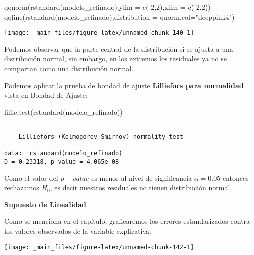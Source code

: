 \documentclass[
  a4paper,
  oneside,
  openany]{book}
\newenvironment{Shaded}{\begin{snugshade}}{\end{snugshade}}
\newcommand{\AttributeTok}[1]{\textcolor[rgb]{0.77,0.63,0.00}{#1}}
\newcommand{\DecValTok}[1]{\textcolor[rgb]{0.00,0.00,0.81}{#1}}
\newcommand{\FunctionTok}[1]{\textcolor[rgb]{0.00,0.00,0.00}{#1}}
\newcommand{\NormalTok}[1]{#1}
\newcommand{\SpecialCharTok}[1]{\textcolor[rgb]{0.00,0.00,0.00}{#1}}
\newcommand{\StringTok}[1]{\textcolor[rgb]{0.31,0.60,0.02}{#1}}
\begin{document}
\begin{Shaded}
\begin{Highlighting}[]
\FunctionTok{qqnorm}\NormalTok{(}\FunctionTok{rstandard}\NormalTok{(modelo\_refinado),}\AttributeTok{ylim =} \FunctionTok{c}\NormalTok{(}\SpecialCharTok{{-}}\DecValTok{2}\NormalTok{,}\DecValTok{2}\NormalTok{),}\AttributeTok{xlim =} \FunctionTok{c}\NormalTok{(}\SpecialCharTok{{-}}\DecValTok{2}\NormalTok{,}\DecValTok{2}\NormalTok{))}
\FunctionTok{qqline}\NormalTok{(}\FunctionTok{rstandard}\NormalTok{(modelo\_refinado),}\AttributeTok{distribution =}\NormalTok{ qnorm,}\AttributeTok{col=}\StringTok{"deeppink4"}\NormalTok{)}
\end{Highlighting}
\end{Shaded}

\begin{center}\texttt{[image: \_main\_files/figure-latex/unnamed-chunk-140-1]} \end{center}

Podemos observar que la parte central de la distribución si se ajusta a una distribución normal, sin embargo, en los extremos los residuales ya no se comportan como una distribución normal.

Podemos aplicar la prueba de bondad de ajuste \textbf{Lilliefors para normalidad} vista en Bondad de Ajuste:

\begin{Shaded}
\begin{Highlighting}[]
\FunctionTok{lillie.test}\NormalTok{(}\FunctionTok{rstandard}\NormalTok{(modelo\_refinado))}
\end{Highlighting}
\end{Shaded}

\begin{verbatim}

    Lilliefors (Kolmogorov-Smirnov) normality test

data:  rstandard(modelo_refinado)
D = 0.23318, p-value = 4.065e-08
\end{verbatim}

Como el valor del \(p-value\) es menor al nivel de significancia \(\alpha=0.05\) entonces rechazamos \(H_{0}\), es decir nuestros residuales no tienen distribución normal.

\textbf{Supuesto de Linealidad}

Como se menciona en el capítulo, graficaremos los errores estandarizados contra los valores observados de la variable explicativa.

\begin{center}\texttt{[image: \_main\_files/figure-latex/unnamed-chunk-142-1]} \end{center}
\end{document}
